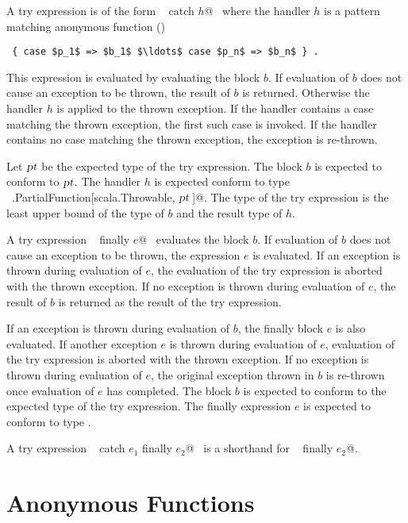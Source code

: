 A try expression is of the form ~ catch $h$@~
where the handler $h$ is a pattern matching anonymous function 
()
\begin{lstlisting}
 { case $p_1$ => $b_1$ $\ldots$ case $p_n$ => $b_n$ } .
\end{lstlisting}
This expression is evaluated by evaluating the block
$b$.  If evaluation of $b$ does not cause an exception to be
thrown, the result of $b$ is returned. Otherwise the 
handler $h$ is applied to the thrown exception.  
If the handler contains a case matching the thrown exception,
the first such case is invoked. If the handler contains
no case matching the thrown exception, the exception is 
re-thrown. 

Let $\mbox{\sl pt}$ be the expected type of the try expression.  The block
$b$ is expected to conform to $\mbox{\sl pt}$.  The handler $h$
is expected conform to type
~\lstinline@scala.PartialFunction[scala.Throwable, $\mbox{\sl pt}\,$]@.  The
type of the try expression is the least upper bound of the type of $b$
and the result type of $h$.

A try expression ~ finally $e$@~ evaluates the block
$b$.  If evaluation of $b$ does not cause an exception to be
thrown, the expression $e$ is evaluated. If an exception is thrown
during evaluation of $e$, the evaluation of the try expression is
aborted with the thrown exception. If no exception is thrown during
evaluation of $e$, the result of $b$ is returned as the
result of the try expression. 

If an exception is thrown during
evaluation of $b$, the finally block
$e$ is also evaluated. If another exception $e$ is thrown
during evaluation of $e$, evaluation of the try expression is
aborted with the thrown exception. If no exception is thrown during
evaluation of $e$, the original exception thrown in $b$ is
re-thrown once evaluation of $e$ has completed.  The block
$b$ is expected to conform to the expected type of the try
expression. The finally expression $e$ is expected to conform to
type .

A try expression ~ catch $e_1$ finally $e_2$@~ 
is a shorthand
for  ~ finally $e_2$@.

\section{Anonymous Functions}
\label{sec:closures}

